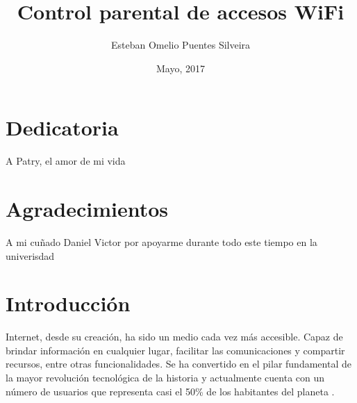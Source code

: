 \documentclass[12pt]{article}
\title{Control parental de accesos WiFi}
\author{Esteban Omelio Puentes Silveira}
\date{Mayo, 2017}
\begin{document}
\maketitle

\clearpage


\section{Dedicatoria}
A Patry, el amor de mi vida

\section{Agradecimientos}
A mi cuñado Daniel Victor por apoyarme durante todo este tiempo en la univerisdad



\renewcommand\contentsname{Índice}
\tableofcontents
\printindex


\section{Introducción}

Internet, desde su creación, ha sido un medio cada vez más accesible. Capaz de brindar información en cualquier lugar, facilitar las comunicaciones y compartir recursos, entre otras funcionalidades. Se ha convertido en el pilar fundamental de la mayor revolución tecnológica de la historia y actualmente cuenta con un número de usuarios que representa casi el 50\% de los habitantes del planeta \cite{InternetUsage}.  
\end{document}

